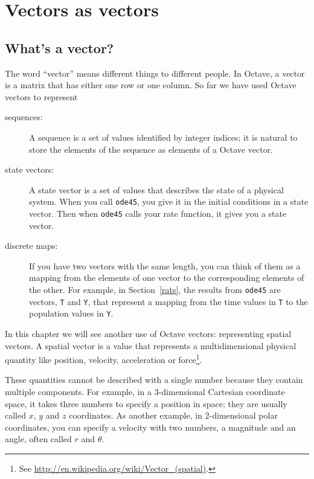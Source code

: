 \documentclass{book}
\begin{document}
\chapter{Vectors as vectors}

\section{What's a vector?}

The word ``vector'' means different things to different people.
In Octave, a vector is a matrix that has either one row or one
column. So far we have used Octave vectors to represent

\begin{description}

\item[sequences:] A sequence is a set of values identified by
integer indices; it is natural to store the elements of the
sequence as elements of a Octave vector.

\item[state vectors:] A state vector is a set of values that
describes the state of a physical system. When you call
{\tt ode45}, you give it in the initial conditions in a state
vector. Then when {\tt ode45} calls your rate function, it
gives you a state vector.

\item[discrete maps:] If you have two vectors with the same
length, you can think of them as a mapping from the elements
of one vector to the corresponding elements of the other. For
example, in Section~\ref{rats}, the results from {\tt ode45}
are vectors, {\tt T} and {\tt Y}, that represent a mapping
from the time values in {\tt T} to the population values in {\tt Y}.

\end{description}

In this chapter we will see another use of Octave vectors:
representing spatial vectors. A spatial vector is a value that
represents a multidimensional physical quantity like position,
velocity, acceleration or force\footnote{See
\url{http://en.wikipedia.org/wiki/Vector_(spatial)}.}.

These quantities cannot be described with a
single number because they contain multiple components. For example,
in a 3-dimensional Cartesian coordinate space, it takes three numbers
to specify a position in space; they are usually called $x$, $y$ and
$z$ coordinates. As another example, in 2-dimensional polar
coordinates, you can specify a velocity with two numbers, a
magnitude and an angle, often called $r$ and $\theta$.
\end{document}
